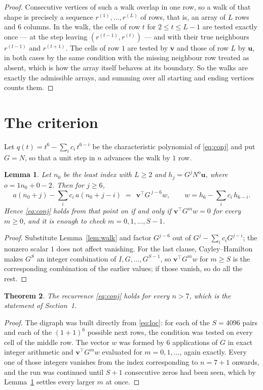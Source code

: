 \documentclass[11pt,a4paper]{article}
\theoremstyle{plain}
\newtheorem{theorem}{Theorem}
\newtheorem{lemma}[theorem]{Lemma}
\theoremstyle{definition}
\begin{document}
\begin{proof}
Consecutive vertices of such a walk overlap in one row, so a walk of that shape is
precisely a sequence $r^{(1)},\dots,r^{(L)}$ of rows, that is, an array of $L$ rows
and $6$ columns. In the walk, the cells of row $t$ for $2\le t\le L-1$ are tested
exactly once --- at the step leaving $(r^{(t-1)},r^{(t)})$ --- and with their true
neighbours $r^{(t-1)}$ and $r^{(t+1)}$. The cells of row $1$ are tested by
$\mathbf{v}$ and those of row $L$ by $\mathbf{u}$, in both cases by the same condition
with the missing neighbour row treated as absent, which is how the array itself behaves at
its boundary. So the walks are exactly the admissible arrays, and summing over all starting
and ending vertices counts them.
\end{proof}

\section{The criterion}

Let $q(t)=t^{6}-\sum_i c_i\,t^{6-i}$ be the characteristic polynomial of
\eqref{eq:conj} and put $G=N$, so that a unit step in $n$ advances the walk by
$1$ row.

\begin{lemma}\label{lem:crit}
Let $n_0$ be the least index with $L\ge2$ and $h_j=G^{j}N^{o}\mathbf{u}$, where
$o=1n_0+0-2$. Then for $j\ge6$,
\[
a(n_0+j)-\sum_i c_i\,a(n_0+j-i)\;=\;\,\mathbf{v}^{\!\top}G^{\,j-6}w,
\qquad w=h_{6}-\sum_i c_i\,h_{6-i} .
\]
Hence \eqref{eq:conj} holds from that point on if and only if
$\mathbf{v}^{\!\top}G^{m}w=0$ for every $m\ge0$, and it is enough to check
$m=0,1,\dots,S-1$.
\end{lemma}

\begin{proof}
Substitute Lemma~\ref{lem:walk} and factor $G^{j-6}$ out of
$G^{j}-\sum_ic_iG^{j-i}$; the nonzero scalar $1$ does not affect
vanishing. For the last clause, Cayley--Hamilton makes $G^{S}$ an integer combination of
$I,G,\dots,G^{S-1}$, so $\mathbf{v}^{\!\top}G^{m}w$ for $m\ge S$ is the corresponding
combination of the earlier values; if those vanish, so do all the rest.
\end{proof}

\begin{theorem}
The recurrence \eqref{eq:conj} holds for every $n>7$, which is the statement of
Section~1.
\end{theorem}

\begin{proof}
The digraph was built directly from \eqref{eq:loc}: for each of the $S=4096$ pairs and each
of the $(1+1)^{6}$ possible next rows, the condition was tested on every cell of
the middle row. The vector $w$ was formed by $6$ applications of $G$ in exact integer
arithmetic and $\mathbf{v}^{\!\top}G^{m}w$ evaluated for $m=0,1,\dots$, again exactly.
Every one of those integers vanishes from the index corresponding to $n=7+1$ onwards,
and the run was continued until $S+1$ consecutive zeros had been seen, which by
Lemma~\ref{lem:crit} settles every larger $m$ at once.
\end{proof}
\end{document}
